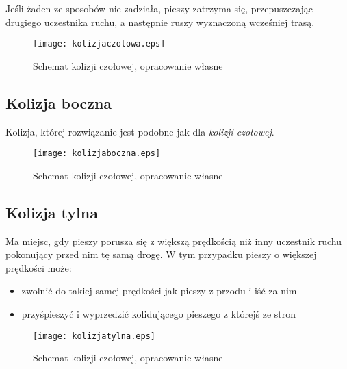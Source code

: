 Jeśli żaden ze sposobów nie zadziała, pieszy zatrzyma się, przepuszczając drugiego uczestnika ruchu, a następnie ruszy wyznaczoną wcześniej trasą.


\begin{figure}
\centering
\texttt{[image: kolizjaczolowa.eps]}
\caption{Schemat kolizji czołowej, opracowanie własne}
\end{figure}

\subsection{Kolizja boczna}

Kolizja, której rozwiązanie jest podobne jak dla \textit{kolizji czołowej}.

\begin{figure}
\centering
\texttt{[image: kolizjaboczna.eps]}
\caption{Schemat kolizji czołowej, opracowanie własne}
\end{figure}

\subsection{Kolizja tylna}

Ma miejsc, gdy pieszy porusza się z większą prędkością niż inny uczestnik ruchu pokonujący przed nim tę samą drogę. W tym przypadku pieszy o większej prędkości może:

\begin{itemize}
\item zwolnić do takiej samej prędkości jak pieszy z przodu i iść za nim
\item przyśpieszyć i wyprzedzić kolidującego pieszego z którejś ze stron
\end{itemize}

\begin{figure}
\centering
\texttt{[image: kolizjatylna.eps]}
\caption{Schemat kolizji czołowej, opracowanie własne}
\end{figure}
